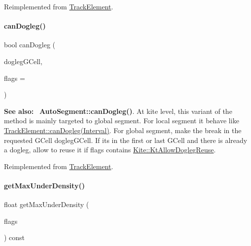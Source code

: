 Reimplemented from \mbox{\hyperlink{classKite_1_1TrackElement_accb4c6a7ee2678a0cff4dbc4a7860fe1}{Track\+Element}}.

\mbox{\label{classKite_1_1TrackSegment_a4f040cf33009e4886d401115c3bea838}} 
\paragraph{\texorpdfstring{can\+Dogleg()}{canDogleg()}\hspace{0.1cm}{\footnotesize\ttfamily [3/3]}}
{\footnotesize\ttfamily bool can\+Dogleg (\begin{DoxyParamCaption}\item[{\textbf{ Katabatic\+::\+G\+Cell} $\ast$}]{dogleg\+G\+Cell,  }\item[{unsigned int}]{flags = {} }\end{DoxyParamCaption})\hspace{0.3cm}{\ttfamily [virtual]}}

{\bfseries See also\+:}~ \textbf{ Auto\+Segment\+::can\+Dogleg()}. At kite level, this variant of the method is mainly targeted to global segment. For local segment it behave like \mbox{\hyperlink{classKite_1_1TrackElement_accb4c6a7ee2678a0cff4dbc4a7860fe1}{Track\+Element\+::can\+Dogleg(\+Interval)}}. For global segment, make the break in the requested G\+Cell {\ttfamily dogleg\+G\+Cell}. If it\textquotesingle{}s in the first or last G\+Cell and there is already a dogleg, allow to reuse it if {\ttfamily flags} contains \mbox{\hyperlink{namespaceKite_acca8fffa3182dea5f94208f454f14b47a766f453d6caa06490196a952762f0bb8}{Kite\+::\+Kt\+Allow\+Dogleg\+Reuse}}. 

Reimplemented from \mbox{\hyperlink{classKite_1_1TrackElement_a4f040cf33009e4886d401115c3bea838}{Track\+Element}}.

\mbox{\label{classKite_1_1TrackSegment_abb61228ad7b29c19c6428902d34126f7}} 
\paragraph{\texorpdfstring{get\+Max\+Under\+Density()}{getMaxUnderDensity()}}
{\footnotesize\ttfamily float get\+Max\+Under\+Density (\begin{DoxyParamCaption}\item[{unsigned int}]{flags }\end{DoxyParamCaption}) const\hspace{0.3cm}{\ttfamily [virtual]}}

